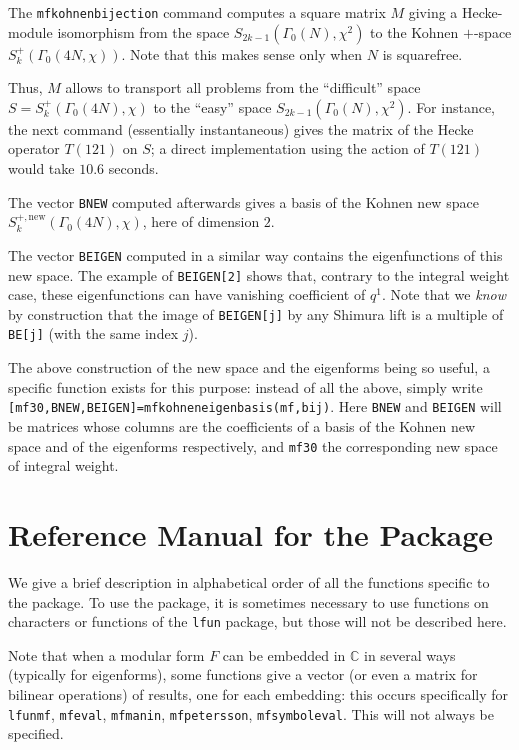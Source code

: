 \documentclass[11pt]{article}
\newcommand{\C}{{\mathbb C}}
\newcommand{\G}{\Gamma}
\def\kbd#1{{\tt #1}}
\begin{document}
The \kbd{mfkohnenbijection} command computes a square matrix $M$ giving
a Hecke-module isomorphism from the space $S_{2k-1}(\G_0(N),\chi^2)$ to the
Kohnen $+$-space $S_k^+(\G_0(4N,\chi))$. Note that this
makes sense only when $N$ is squarefree.

Thus, $M$ allows to transport all problems from the ``difficult'' space
$S=S_k^+(\G_0(4N),\chi)$ to the ``easy'' space $S_{2k-1}(\G_0(N),\chi^2)$.
For instance, the next command (essentially instantaneous) gives the matrix of
the Hecke operator $T(121)$ on $S$; a direct implementation using the action
of $T(121)$ would take $10.6$ seconds.

The vector \kbd{BNEW} computed afterwards gives a basis of the Kohnen new
space $S_k^{+,\text{new}}(\G_0(4N),\chi)$, here of dimension $2$.

The vector \kbd{BEIGEN} computed in a similar way contains the eigenfunctions
of this new space. The example of \kbd{BEIGEN[2]} shows that, contrary to
the integral weight case, these eigenfunctions can have vanishing coefficient
of $q^1$. Note that we \emph{know} by construction that the image of
\kbd{BEIGEN[j]} by any Shimura lift is a multiple of \kbd{BE[j]} (with the
same index $j$).
\smallskip

The above construction of the new space and the eigenforms being so useful,
a specific function exists for this purpose: instead of all the above,
simply write \kbd{[mf30,BNEW,BEIGEN]=mfkohneneigenbasis(mf,bij)}. Here
\kbd{BNEW} and \kbd{BEIGEN} will be matrices whose columns are the
coefficients of a basis of the Kohnen new space and of the eigenforms
respectively, and \kbd{mf30} the corresponding new space of integral weight.

\section{Reference Manual for the Package}

We give a brief description in alphabetical order of all the functions
specific to the package. To use the package, it is sometimes necessary to
use functions on characters or functions of the \kbd{lfun} package, but
those will not be described here.

Note that when a modular form $F$ can be embedded in $\C$ in several ways
(typically for eigenforms), some functions give a vector (or even a matrix
for bilinear operations) of results, one for each embedding: this occurs
specifically for \kbd{lfunmf}, \kbd{mfeval}, \kbd{mfmanin}, \kbd{mfpetersson},
\kbd{mfsymboleval}. This will not always be specified.
\end{document}
